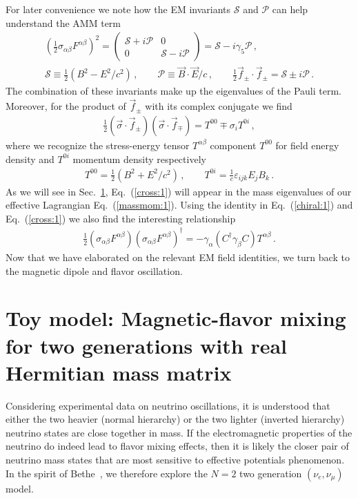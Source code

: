\documentclass[addchapnum]{ws-rv961x669} %
\newcommand{\req}[1]{Eq.~(\ref{#1})}
\newcommand{\rsec}[1]{Sec.~{\ref{#1}}}
\begin{document}
For later convenience we note how the EM invariants $\mathcal{S}$ and $\mathcal{P}$ can help understand the AMM term 
\begin{align}
    \label{invar:1}
    \left(\frac{1}{2}\sigma_{\alpha\beta}F^{\alpha\beta}\right)^{2}=
    \begin{pmatrix}
        \mathcal{S}+i\mathcal{P} & 0\\
        0 & \mathcal{S}-i\mathcal{P}
    \end{pmatrix}=\mathcal{S}-i\gamma_{5}\mathcal{P}\,,\\
    \mathcal{S}\equiv\frac{1}{2}\left(B^{2}-E^{2}/c^{2}\right)\,,\qquad
    \mathcal{P}\equiv\vec{B}\cdot\vec{E}/c\,,\qquad
    \frac{1}{2}\vec{f}_{\pm}\cdot\vec{f}_{\pm}=\mathcal{S}\pm i\mathcal{P}\,.
\end{align}
The combination of these invariants make up the eigenvalues of the Pauli term. Moreover, for the product of $\vec{f}_{\pm}$ with its complex conjugate we find
\begin{align}
        \label{cross:1}
        \frac{1}{2}\left(\vec{\sigma}\cdot\vec{f}_{\pm}\right)\left(\vec{\sigma}\cdot\vec{f}_{\mp}\right)=T^{00}\mp \sigma_{i}T^{0i}\,,
\end{align}
where we recognize the stress-energy tensor $T^{\alpha\beta}$ component $T^{00}$ for field energy density and $T^{0i}$ momentum density respectively
\begin{align}
    T^{00}=\frac{1}{2}\left(B^{2}+E^{2}/c^{2}\right)\,,\qquad
    T^{0i}=\frac{1}{c}\varepsilon_{ijk}E_{j}B_{k}\,.
\end{align}
As we will see in \rsec{sec:toy}, \req{cross:1} will appear in the mass eigenvalues of our effective Lagrangian \req{massmom:1}. Using the identity in \req{chiral:1} and \req{cross:1} we also find the interesting relationship
\begin{align}
    \label{cross:2}
    \frac{1}{2}\left(\sigma_{\alpha\beta}F^{\alpha\beta}\right)\left(\sigma_{\alpha\beta}F^{\alpha\beta}\right)^{\dag}=
    -\gamma_{\alpha}\left(C^{\dag}\gamma_{\beta}C\right)T^{\alpha\beta}\,.
\end{align}
Now that we have elaborated on the relevant EM field identities, we turn back to the magnetic dipole and flavor oscillation.

\section{Toy model: Magnetic-flavor mixing for two generations with real Hermitian mass matrix}
\label{sec:toy}
Considering experimental data on neutrino oscillations, it is understood that either the two heavier (normal hierarchy) or the two lighter (inverted hierarchy) neutrino states are close together in mass. If the electromagnetic properties of the neutrino do indeed lead to flavor mixing effects, then it is likely the closer pair of neutrino mass states that are most sensitive to effective potentials phenomenon. In the spirit of Bethe~\cite{Bethe:1986ej}, we therefore explore the $N=2$ two generation $(\nu_{e},\nu_{\mu})$ model.
\end{document}
